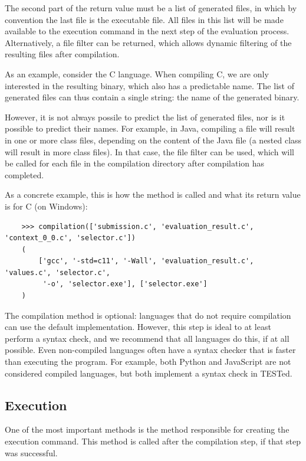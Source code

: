 \documentclass[../main]{subfiles}
\begin{document}
The second part of the return value must be a list of generated files, in which by convention the last file is the executable file.
All files in this list will be made available to the execution command in the next step of the evaluation process.
Alternatively, a file filter can be returned, which allows dynamic filtering of the resulting files after compilation.

As an example, consider the C language.
When compiling C, we are only interested in the resulting binary, which also has a predictable name.
The list of generated files can thus contain a single string: the name of the generated binary.

However, it is not always possile to predict the list of generated files, nor is it possible to predict their names.
For example, in Java, compiling a file will result in one or more class files, depending on the content of the Java file (a nested class will result in more class files).
In that case, the file filter can be used, which will be called for each file in the compilation directory after compilation has completed.

As a concrete example, this is how the method is called and what its return value is for C (on Windows):

\begin{verbatim}
    >>> compilation(['submission.c', 'evaluation_result.c', 'context_0_0.c', 'selector.c'])
    (
        ['gcc', '-std=c11', '-Wall', 'evaluation_result.c', 'values.c', 'selector.c',
         '-o', 'selector.exe'], ['selector.exe']
    )
\end{verbatim}

The compilation method is optional: languages that do not require compilation can use the default implementation.
However, this step is ideal to at least perform a syntax check, and we recommend that all languages do this, if at all possible.
Even non-compiled languages often have a syntax checker that is faster than executing the program.
For example, both Python and JavaScript are not considered compiled languages, but both implement a syntax check in TESTed.

\subsection{Execution}\label{subsec:impl-execution}

One of the most important methods is the method responsible for creating the execution command.
This method is called after the compilation step, if that step was successful.
\end{document}
